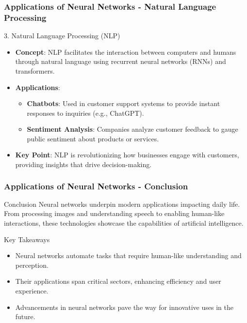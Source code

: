 \documentclass[aspectratio=169]{beamer}
\begin{document}
\begin{frame}[fragile]
    \frametitle{Applications of Neural Networks - Natural Language Processing}
    \begin{block}{3. Natural Language Processing (NLP)}
        \begin{itemize}
            \item \textbf{Concept}: NLP facilitates the interaction between computers and humans through natural language using recurrent neural networks (RNNs) and transformers.
            \item \textbf{Applications}:
                \begin{itemize}
                    \item \textbf{Chatbots}: Used in customer support systems to provide instant responses to inquiries (e.g., ChatGPT).
                    \item \textbf{Sentiment Analysis}: Companies analyze customer feedback to gauge public sentiment about products or services.
                \end{itemize}
            \item \textbf{Key Point}: NLP is revolutionizing how businesses engage with customers, providing insights that drive decision-making.
        \end{itemize}
    \end{block}
\end{frame}

\begin{frame}[fragile]
    \frametitle{Applications of Neural Networks - Conclusion}
    \begin{block}{Conclusion}
        Neural networks underpin modern applications impacting daily life. From processing images and understanding speech to enabling human-like interactions, these technologies showcase the capabilities of artificial intelligence.
    \end{block}
    \begin{block}{Key Takeaways}
        \begin{itemize}
            \item Neural networks automate tasks that require human-like understanding and perception.
            \item Their applications span critical sectors, enhancing efficiency and user experience.
            \item Advancements in neural networks pave the way for innovative uses in the future.
        \end{itemize}
    \end{block}
\end{frame}
\end{document}
